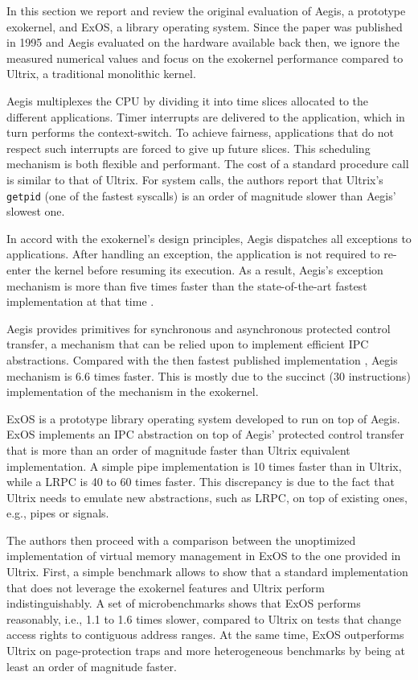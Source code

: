 
In this section we report and review the original evaluation of Aegis, a prototype exokernel, and ExOS, a library operating system.
Since the paper was published in 1995 and Aegis evaluated on the hardware available back then, we ignore the measured numerical values and focus on the exokernel performance compared to Ultrix, a traditional monolithic kernel.

Aegis multiplexes the CPU by dividing it into time slices allocated to the different applications.
Timer interrupts are delivered to the application, which in turn performs the context-switch.
To achieve fairness, applications that do not respect such interrupts are forced to give up future slices.
This scheduling mechanism is both flexible and performant.
The cost of a standard procedure call is similar to that of Ultrix.
For system calls, the authors report that Ultrix's \lstinline{getpid} (one of the fastest syscalls) is an order of magnitude slower than Aegis' slowest one.

In accord with the exokernel's design principles, Aegis dispatches all exceptions to applications.
After handling an exception, the application is not required to re-enter the kernel before resuming its execution.
As a result, Aegis's exception mechanism is more than five times faster than the state-of-the-art fastest implementation at that time \cite{DBLP:conf/asplos/ThekkathL94}.

Aegis provides primitives for synchronous and asynchronous protected control transfer, a mechanism that can be relied upon to implement efficient IPC abstractions.
Compared with the then fastest published implementation \cite{DBLP:conf/sosp/Liedtke93}, Aegis mechanism is 6.6 times faster.
This is mostly due to the succinct (30 instructions) implementation of the mechanism in the exokernel.

ExOS is a prototype library operating system developed to run on top of Aegis.
ExOS implements an IPC abstraction on top of Aegis' protected control transfer that is more than an order of magnitude faster than Ultrix equivalent implementation.
A simple pipe implementation is 10 times faster than in Ultrix, while a LRPC is 40 to 60 times faster.
This discrepancy is due to the fact that Ultrix needs to emulate new abstractions, such as LRPC, on top of existing ones, e.g., pipes or signals.

The authors then proceed with a comparison between the unoptimized implementation of virtual memory management in ExOS to the one provided in Ultrix.
First, a simple benchmark allows to show that a standard implementation that does not leverage the exokernel features and Ultrix perform indistinguishably.
A set of microbenchmarks shows that ExOS performs reasonably, i.e., 1.1 to 1.6 times slower, compared to Ultrix on tests that change access rights to contiguous address ranges.
At the same time, ExOS outperforms Ultrix on page-protection traps and more heterogeneous benchmarks by being at least an order of magnitude faster.